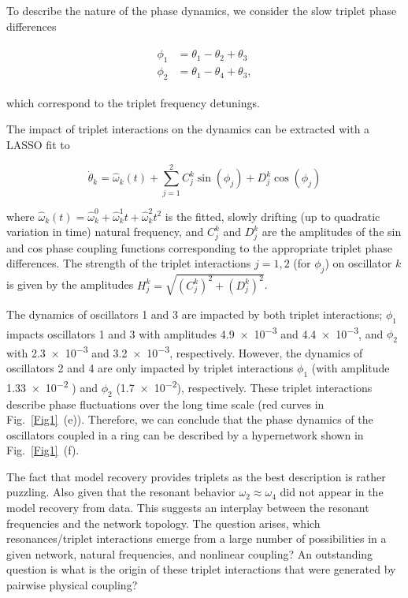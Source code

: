 \documentclass[12pt]{article}
\theoremstyle{plain}
\theoremstyle{definition}
\theoremstyle{remark}
\theoremstyle{remark}
\begin{document}
To describe the nature of the phase dynamics, we consider the slow triplet phase differences
\begin{linenomath}
\begin{eqnarray}
\begin{split}\label{slow_phases}
\phi_1 &= \theta_1  - \theta_2 + \theta_3 \\
\phi_2 &= \theta_1 - \theta_4 + \theta_3,
\end{split}
\end{eqnarray}
\end{linenomath}
which correspond to the triplet frequency detunings. 

The impact of triplet interactions on the dynamics can be extracted with a LASSO fit to 
\begin{linenomath}
\begin{equation}\label{eq:exp}
\dot{\theta}_k = \hat{\omega}_k(t) +   \sum_{j=1}^{2} C_j^k \sin (\phi_j) 
+ D_j^k \cos (\phi_j)
\end{equation}
\end{linenomath}
where $\hat{\omega}_k(t) = \hat{\omega}^0_k + \hat{\omega}^1_k t + \hat{\omega}^2_k t^2 $  is the fitted, slowly drifting (up to quadratic variation in time) natural frequency, and $C_j^k$ and $D_j^k$ are the amplitudes  of the sin and cos phase  coupling functions corresponding to the appropriate triplet phase differences. The strength of the triplet interactions $j=1,2$ (for $\phi_j$) on oscillator $k$ is given by the amplitudes $H_j^k = \sqrt{(C^k_j)^2  + (D^k_j)^2}$. 

The dynamics of oscillators 1 and 3 are  impacted by both triplet interactions; $\phi_1$ impacts oscillators 1 and 3 with amplitudes \num{4.9e-3} and \num{4.4e-3}, and $\phi_2$ with  \num{2.3e-3} and  \num{3.2e-3}, respectively. However, the dynamics of oscillators 2 and 4 are only impacted by triplet interactions $\phi_1$ (with amplitude \num{1.33e-2} ) and $\phi_2$ (\num{1.7e-2}), respectively.  These triplet interactions describe phase fluctuations  over the long time scale (red curves in Fig.~\ref{Fig1}~(e)). Therefore, we can conclude that the phase dynamics of the oscillators coupled in a ring can be described by a hypernetwork shown in Fig.~\ref{Fig1}~(f). 

{\color{black} The fact that model recovery provides triplets as the best description is rather puzzling. Also given that the resonant behavior $\omega_2 \approx \omega_4$ did not appear in the model recovery from data. This suggests an interplay between the resonant frequencies and the network topology. The question arises, which resonances/triplet interactions emerge from a large number of possibilities in a given network, natural frequencies, and nonlinear coupling? } An outstanding question is  what is the origin of these triplet interactions that were generated by pairwise physical coupling? 
\end{document}
